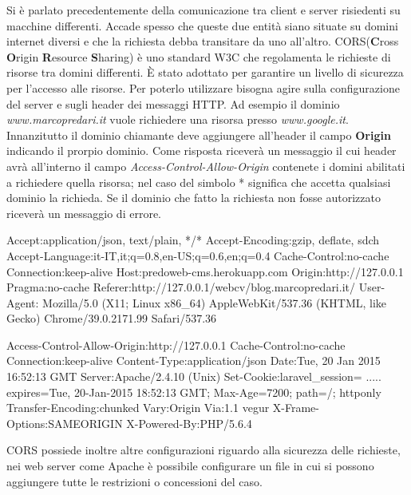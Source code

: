 Si è parlato precedentemente della comunicazione tra client e server risiedenti su macchine differenti. Accade spesso che queste due entità siano situate su domini internet diversi e che la richiesta debba transitare da uno all'altro. CORS(\textbf{C}ross \textbf{O}rigin \textbf{R}esource \textbf{S}haring) è uno standard W3C che regolamenta le richieste di risorse tra domini differenti. È stato adottato per garantire un livello di sicurezza per l'accesso alle risorse. Per poterlo utilizzare bisogna agire sulla configurazione del server e sugli header dei messaggi HTTP.
Ad esempio il dominio \emph{www.marcopredari.it} vuole richiedere una risorsa presso \emph{www.google.it}. Innanzitutto il dominio chiamante deve aggiungere all'header il campo \textbf{Origin} indicando il prorpio dominio. Come risposta riceverà un messaggio il cui header avrà all'interno il campo \textit{Access-Control-Allow-Origin} contenete i domini abilitati a richiedere quella risorsa; nel caso del simbolo * significa che accetta qualsiasi dominio la richieda. Se il dominio che fatto la richiesta non fosse autorizzato riceverà un messaggio di errore. \cite{web:cors}

\begin{code}[caption={esempio di richiesta HTTP utilizzando CORS}, label={lst:CORSrequest}]
	Accept:application/json, text/plain, */*
	Accept-Encoding:gzip, deflate, sdch
	Accept-Language:it-IT,it;q=0.8,en-US;q=0.6,en;q=0.4
	Cache-Control:no-cache
	Connection:keep-alive
	Host:predoweb-cms.herokuapp.com
	Origin:http://127.0.0.1
	Pragma:no-cache
	Referer:http://127.0.0.1/webcv/blog.marcopredari.it/
	User-Agent: Mozilla/5.0 (X11; Linux x86_64) 
			    AppleWebKit/537.36 (KHTML, like Gecko) 
			    Chrome/39.0.2171.99 Safari/537.36
\end{code}

\begin{code}[caption={esempio di risposta dal server che utilizza CORS}, label={lst:CORSanswer}]
	Access-Control-Allow-Origin:http://127.0.0.1
	Cache-Control:no-cache
	Connection:keep-alive
	Content-Type:application/json
	Date:Tue, 20 Jan 2015 16:52:13 GMT
	Server:Apache/2.4.10 (Unix)
	Set-Cookie:laravel_session= .....
			   expires=Tue, 20-Jan-2015 18:52:13 GMT; 
			   Max-Age=7200; 
			   path=/; 
			   httponly
	Transfer-Encoding:chunked
	Vary:Origin
	Via:1.1 vegur
	X-Frame-Options:SAMEORIGIN
	X-Powered-By:PHP/5.6.4
\end{code}

CORS possiede inoltre altre configurazioni riguardo alla sicurezza delle richieste, nei web server come Apache è possibile configurare un file in cui si possono aggiungere tutte le restrizioni o concessioni del caso.

